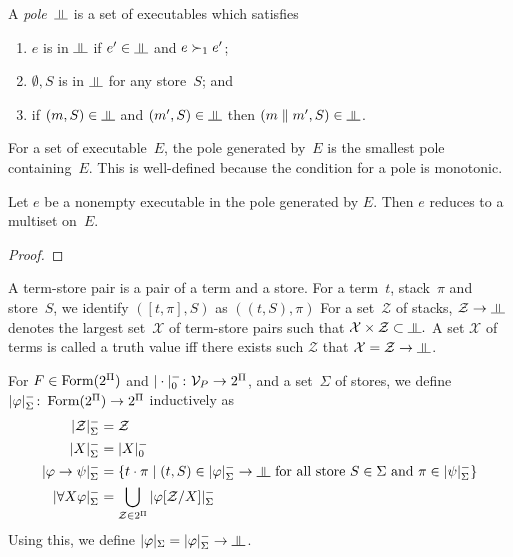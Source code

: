 A \textit{pole}~$\bbot$ is a set of executables
which satisfies
\begin{enumerate}
 \item $e$ is in $\bbot$ if $e'\in\bbot$ and
       $e\succ_1 e'$;
 \item $\emptyset, S$ is in $\bbot$ for any store~$S$; and
 \item if $(m,S)\in\bbot$ and $(m',S)\in\bbot$
       then $(m\conc m',S)\in\bbot$.
\end{enumerate}
For a set of executable~$E$, the pole generated by~$E$ is the smallest
pole containing~$E$.
This is well-defined because the condition for a pole is monotonic.
\begin{proposition}
 Let $e$ be a nonempty executable in the pole generated by $E$.
 Then $e$ reduces to a multiset on~$E$.
\end{proposition}
\begin{proof}
\end{proof}

A term-store pair is a pair of a term and a store.
For a term~$t$, stack~$\pi$ and store~$S$, we identify $([t,\pi], S)$
as $((t,S), \pi)$
For a set~$\mathcal Z$ of stacks, $\mathcal Z\imp\bbot$ denotes
the largest set~$\mathcal X$ of term-store pairs such that
$\mathcal X\times\mathcal Z\subset \bbot.$
A set $\mathcal X$ of terms is called a truth value
iff there exists
such $\mathcal Z$ that $\mathcal X = \mathcal Z\imp \bbot$.

\renewcommand{\sem}[1]{|{#1}|}
\newcommand{\nsem}[1]{\sem{#1}^-}
For $F\in\mathop{\text{Form}}(2^\Pi)$ and $|\cdot|^-_0\colon\mathcal V_P\rightarrow 2^\Pi$,
and a set~$\Sigma$ of stores,
we define $\nsem{\phi}_\Sigma\colon \form(2^\Pi)\rightarrow
2^\Pi$ inductively as
\begin{align*}
 \nsem{\mathcal Z}_\Sigma &= \mathcal Z \\
 \nsem{X}_\Sigma&= |X|_0^- \\
 \nsem{\phi\imp\psi}_\Sigma&=
 \{t\cdot\pi\mid(t,S)\in\nsem\phi_\Sigma\rightarrow\bbot\text{ for all store
 }S\in \Sigma\text{ and }\pi\in\nsem\psi_\Sigma\}
 \\
 \nsem{\forall X\phi}_\Sigma&=
 \bigcup_{\mathcal Z\in 2^\Pi} \nsem{\phi[\mathcal Z/X]}_\Sigma
\end{align*}
Using this, we define $\sem \phi_\Sigma=\nsem{\phi}_\Sigma\rightarrow\bbot$.

